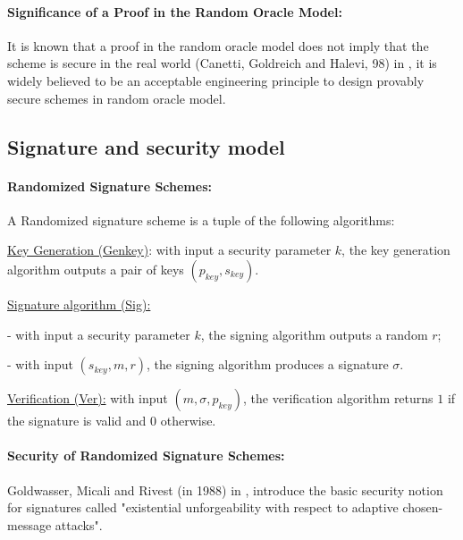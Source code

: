 \documentclass[a4paper,11pt]{article}
\begin{document}
\vspace{0.2cm}

\paragraph{Significance of a Proof in the Random Oracle Model:}

It is known that a proof in the random oracle model does not imply that the scheme is secure in the real
world (Canetti, Goldreich and Halevi,  98) in \cite{Canetti}, it is  widely believed to be an acceptable engineering principle to design provably secure schemes in random oracle model.

\subsection{Signature and security model}\label{sec:one:2}

\paragraph{Randomized Signature Schemes:}

A Randomized signature scheme is a tuple of the following algorithms:

\underline{Key Generation (Genkey)}: with input a security parameter $k$, the key generation algorithm outputs a pair of keys $(p_{key}, s_{key})$.


\underline{Signature algorithm (Sig):}

- with input a security parameter $k$, the signing algorithm outputs a random $r$;

- with input $(s_{key}, m,r)$, the signing algorithm  produces a signature $\sigma$.

\underline{Verification (Ver):}  with input $(m, \sigma, p_{key})$, the verification algorithm returns $1$ if the signature is valid and $0$ otherwise.


\paragraph{Security of Randomized Signature Schemes:}

Goldwasser, Micali and Rivest (in 1988)  in \cite{Goldwasser}, introduce the basic security notion for signatures called "existential unforgeability with respect to adaptive chosen-message attacks".
\end{document}
